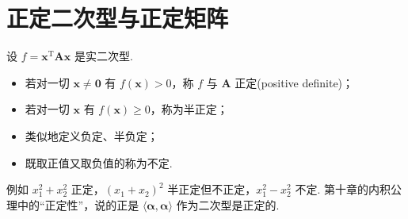 \documentclass[lang=cn,10.5pt,scheme=chinese,toc=twocol,section,chinesefont=nofont,
twoside,citestyle=gb7714-2015,bibstyle=gb7714-2015]{elegantbook}
\DeclareRobustCommand{\textbf}[1]{{\lnsemiboldlatin\lnsemiboldcjk #1}}
\newcommand{\vv}[1]{\boldsymbol{#1}}
\newcommand{\zero}{\boldsymbol{0}}          %
\newcommand{\trans}{\mathrm{T}}             %
\numberwithin{equation}{section}   %
\begin{document}
\section{正定二次型与正定矩阵}

\begin{definition}
  设 $f=\vv x^\trans\vv A\vv x$ 是实二次型.
  \begin{itemize}
    \item 若对一切 $\vv x\ne\zero$ 有 $f(\vv x)>0$，称 $f$ 与 $\vv A$ \textbf{正定}(positive definite)；
    \item 若对一切 $\vv x$ 有 $f(\vv x)\ge0$，称为\textbf{半正定}；
    \item 类似地定义\textbf{负定}、\textbf{半负定}；
    \item 既取正值又取负值的称为\textbf{不定}.
  \end{itemize}
\end{definition}

例如 $x_1^2+x_2^2$ 正定，$(x_1+x_2)^2$ 半正定但不正定，$x_1^2-x_2^2$ 不定. 第十章的内积公理中的“正定性”，说的正是 $\langle\vv\alpha,\vv\alpha\rangle$ 作为二次型是正定的.
\end{document}
